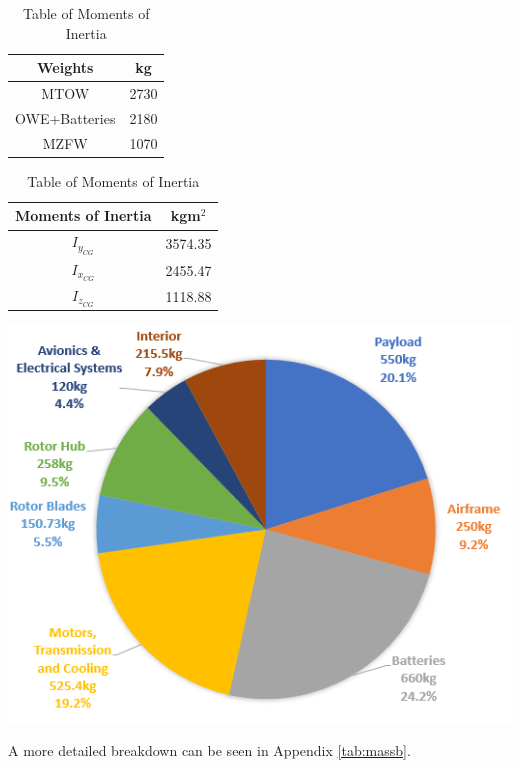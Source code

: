 \documentclass[11pt,a4paper]{article}
\begin{document}
\begin{table}[H]
	\begin{minipage}{0.5\linewidth}
		\caption{Table of key weights}
		\label{tab:tabmass}
		\centering
\begin{tabular}{cc}
    \hline
    \rowcolor[HTML]{DAE8FC} 
    Weights       & kg   \\ \hline
    MTOW          & 2730 \\ \hline
    OWE+Batteries & 2180 \\ \hline
    MZFW          & 1070 \\ \hline
\end{tabular}
\caption{Table of Moments of Inertia}
		\label{tab:tabinertia}
\begin{tabular}{cc}
\hline
\rowcolor[HTML]{DAE8FC} 
Moments of Inertia & kgm$^2$   \\ \hline
$I_{y_{CG}}$        & 3574.35 \\ \hline
$I_{x_{CG}}$        & 2455.47 \\ \hline
$I_{z_{CG}}$        & 1118.88 \\ \hline
\end{tabular}
	\end{minipage}\hfill
	\begin{minipage}{0.45\linewidth}
		\centering
		\includegraphics[width=\textwidth]{PIE.PNG}
		\label{fig:pie}
	\end{minipage}
\end{table}
A more detailed breakdown can be seen in Appendix \ref{tab:massb}.
\end{document}
